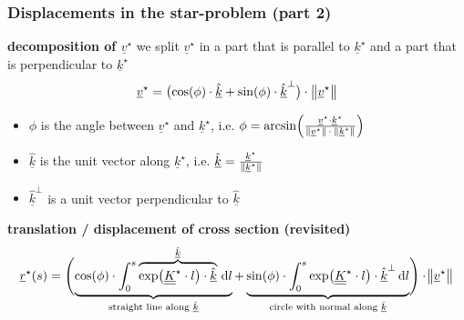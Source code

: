 \begin{frame}
  \frametitle{Displacements in the star-problem (part 2)}
  
  \textbf{decomposition of $\underline{v}^{\star}$} \newline
  we split $\underline{v}^{\star}$ in a part that is parallel to $\underline{k}^{\star}$ and a part that is perpendicular to $\underline{k}^{\star}$
  \begin{displaymath}
    \underline{v}^{\star} = \bigl( \cos(\phi) \cdot \underline{\hat{k}} + \sin(\phi) \cdot \underline{\hat{k}}^{\perp} \bigr) \cdot \, \norm[1]{\underline{v}^{\star}}
  \end{displaymath}
  \begin{itemize}
    \item $\phi$ is the angle between $\underline{v}^{\star}$ and $\underline{k}^{\star}$, i.e. $\phi = \arcsin \Bigl( \frac{\underline{v}^{\star} \cdot \underline{k}^{\star}}{\norm[0]{\underline{v}^{\star}} \, \cdot \: \norm[0]{\underline{k}^{\star}}} \Bigr)$
    \item $\underline{\hat{k}}$ is the unit vector along $\underline{k}^{\star}$, i.e. $\underline{\hat{k}} = \frac{\underline{k}^{\star}}{\norm[0]{\underline{k}^{\star}}}$
    \item $\underline{\hat{k}}^{\perp}$ is a unit vector perpendicular to $\underline{\hat{k}}$ %
  \end{itemize}
  
  \vspace{0.5em}
  \textbf{translation / displacement of cross section (revisited)}
  \begin{displaymath}
    \underline{r}^{\star}(s) = \Biggl( \underbrace{\cos(\phi) \cdot \int_0^s \overbrace{\exp \bigl( \doubleunderline{K}^{\star} \cdot l \bigr) \cdot \underline{\hat{k}} }^{\underline{\hat{k}}} \, \dif l}_{\text{straight line along }\underline{\hat{k}}}  + \underbrace{ \sin(\phi) \cdot \int_0^s \exp \bigl( \doubleunderline{K}^{\star} \cdot l \bigr) \cdot \underline{\hat{k}}^{\perp} \dif l}_{\text{circle with normal along }\underline{\hat{k}}} \Biggr) \cdot \norm[1]{\underline{v}^{\star}}
  \end{displaymath}
  
\end{frame}


